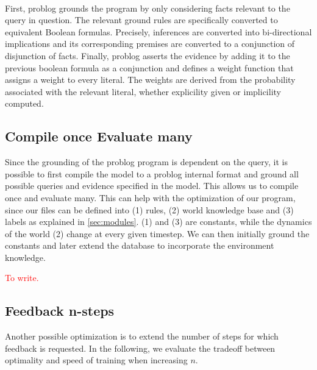 \paragraph{}
First, problog grounds the program by only considering facts relevant to the query in question. 
The relevant ground rules are specifically converted to equivalent Boolean formulas. 
Precisely, inferences are converted into bi-directional implications and its corresponding premises 
are converted to a conjunction of disjunction of facts. 
Finally, problog asserts the evidence by adding it to the previous boolean formula 
as a conjunction and defines a weight function that assigns a weight to every literal. 
The weights are derived from the probability associated with the relevant literal, whether explicility 
given or implicility computed. 


\subsection{Compile once Evaluate many}
Since the grounding of the problog program is dependent on the query, it is possible to first compile the model 
to a problog internal format and ground all possible queries and evidence specified in the model. This allows us 
to compile once and evaluate many. This can help with the optimization of our program, since our files can be defined into 
(1) rules, (2) world knowledge base and (3) labels as explained in \ref{sec:modules}. (1) and (3) are constants, while the dynamics 
of the world (2) change at every given timestep. We can then initially ground the constants and later 
extend the database to incorporate the environment knowledge. 
 
\textcolor{red}{To write.} 

\subsection{Feedback n-steps} 
Another possible optimization is to extend the number of steps for which feedback is requested. In the 
following, we evaluate the tradeoff between optimality and speed of training when increasing $n$. 




